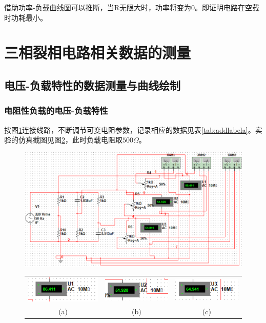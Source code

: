 \documentclass[12pt]{article}%
\begin{document}
借助功率-负载曲线图可以推断，当R无限大时，功率将变为0。即证明电路在空载时功耗最小。
\section{三相裂相电路相关数据的测量}
\subsection{电压-负载特性的数据测量与曲线绘制}
\subsubsection{电阻性负载的电压-负载特性}
按图\ref{fig:a19}连接线路，不断调节可变电阻参数，记录相应的数据见表\ref{tab:addlabela}。实验的仿真截图见图\ref{fig:a19xx}，此时负载电阻取$500\Omega$。
\begin{figure}[htbp]
\centering\includegraphics[width=\linewidth]{TIM20180607123951.png}
\caption{\heiti{}}\label{fig:a19}
\end{figure}
\begin{figure}[htbp]
\begin{tabular}{ccc}
\includegraphics[width=0.3\linewidth]{TIM20180607123059.png}&
\includegraphics[width=0.3\linewidth]{TIM20180607123140.png}&
\includegraphics[width=0.3\linewidth]{TIM20180607123158.png}\\
(a)&(b)&(c)\\
\end{tabular}
\caption{\heiti{}}\label{fig:a19xx}
\end{figure}
\end{document}
